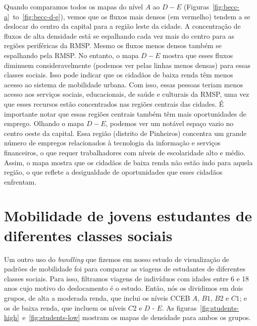 Quando comparamos todos os mapas do nível $A$ ao $D-E$
(Figuras~\ref{fig:becc-a}~to~\ref{fig:becc-d-e}), vemos que os fluxos mais
densos (em vermelho) tendem a se deslocar do centro da capital para a região
leste da cidade. A concentração de fluxos de alta densidade está se espalhando
cada vez mais do centro para as regiões periféricas da RMSP. Mesmo os fluxos
menos densos também se espalhando pela RMSP. No entanto, o mapa $D-E$ mostra que
esses fluxos diminuem consideravelmente (podemos ver pelas linhas menos densas)
para essas classes sociais. Isso pode indicar que os cidadãos de baixa renda
têm menos acesso ao sistema de mobilidade urbana. Com isso, essas pessoas teriam
menos acesso aos serviços sociais, educacionais, de saúde e culturais da RMSP,
uma vez que esses recursos estão concentrados nas regiões centrais das cidades.
É importante notar que essas regiões centrais também têm mais oportunidades de
emprego. Olhando o mapa $D-E$, podemos ver um notável espaço vazio no centro
oeste da capital. Essa região (distrito de Pinheiros) concentra um grande número
de empregos relacionados à tecnologia da informação e serviços financeiros, o
que requer trabalhadores com níveis de escolaridade alto e médio. Assim, o mapa
mostra que os cidadãos de baixa renda não estão indo para aquela região, o que
reflete a desigualdade de oportunidades que esses cidadãos enfrentam.

\section{Mobilidade de jovens estudantes de diferentes classes sociais}
\label{sec:students}

Um outro uso do \emph{bundling} que fizemos em nosso estudo de visualização de padrões de
mobilidade foi para comparar as viagens de estudantes de diferentes classes
sociais. Para isso, filtramos viagens de indivíduos com idades entre 6 e 18 anos
cujo motivo do deslocamento é o estudo. Então, nós os dividimos em dois grupos,
de alta a moderada renda, que inclui os níveis CCEB $A$, $B1$, $B2$ e $C1$; e os
de baixa renda, que incluem os níveis $C2$ e $D$ - $E$. As
figuras~\ref{fig:students-high}~e~\ref{fig:students-low} mostram os mapas de
densidade para ambos os grupos.

